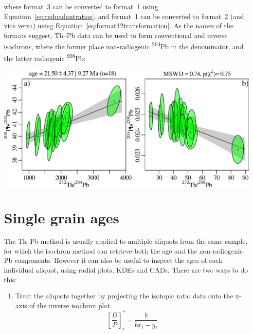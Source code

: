 \begin{refsection}
\noindent where format~3 can be converted to format~1 using
Equation~\ref{eq:redundantratios}, and format~1 can be converted to
format~2 (and vice versa) using
Equation~\ref{eq:format12transformation}. As the names of the formats
suggest, Th--Pb data can be used to form conventional and inverse
isochrons, where the former place non-radiogenic
\textsuperscript{204}Pb in the denominator, and the latter radiogenic
\textsuperscript{208}Pb:\\

\noindent\begin{minipage}[t][][b]{.7\linewidth}
\includegraphics[width=\textwidth]{../figures/ThPb.pdf}
\end{minipage}
\begin{minipage}[t][][t]{.3\linewidth}
  \label{fig:agediscordance}
\end{minipage}

\section{Single grain ages}\label{it:ThPbPbradial}

The Th--Pb method is usually applied to multiple aliquots from the
same sample, for which the isochron method can retrieve both the age
and the non-radiogenic Pb components. However it can also be useful to
inspect the ages of each individual aliquot, using radial plots, KDEs
and CADs. There are two ways to do this:

\begin{enumerate}
  \item Treat the aliquots together by projecting the isotopic ratio
    data onto the x-axis of the inverse isochron plot.
    \begin{equation}
      \left[\frac{D}{P}\right]_i^\ast = \frac{b}{b x_i - y_i}
      \label{eq:DP*inverse}
    \end{equation}
    

\end{enumerate}
\end{refsection}
